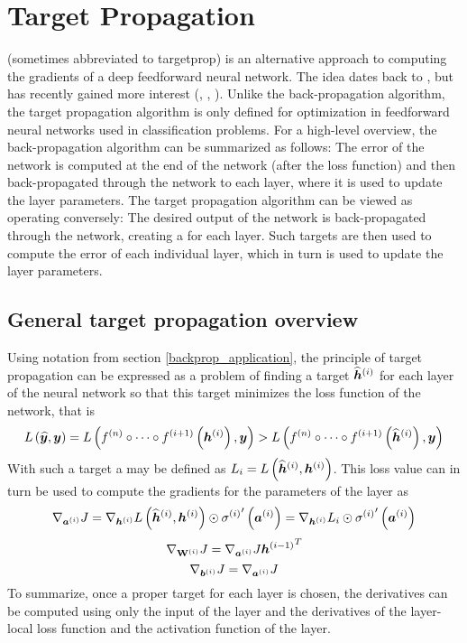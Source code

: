 \chapter{Target Propagation}\label{targetprop}

 (sometimes abbreviated to targetprop) is an alternative approach to computing the gradients of a deep feedforward neural network. The idea dates back to \cite{lecun_learning_1986}, but has recently gained more interest (\cite{bengio_how_2014}, \cite{bengio_towards_2015}, \cite{lee_difference_2015}). Unlike the back-propagation algorithm, the target propagation algorithm is only defined for optimization in feedforward neural networks used in classification problems. For a high-level overview, the back-propagation algorithm can be summarized as follows: The error of the network is computed at the end of the network (after the loss function) and then back-propagated through the network to each layer, where it is used to update the layer parameters. The target propagation algorithm can be viewed as operating conversely: The desired output of the network is back-propagated through the network, creating a  for each layer. Such targets are then used to compute the error of each individual layer, which in turn is used to update the layer parameters.


\section{General target propagation overview}

Using notation from section \ref{backprop_application}, the principle of target propagation can be expressed as a problem of finding a target \( \widehat{\bm{h}}^{(i)} \) for each layer of the neural network so that this target minimizes the loss function of the network, that is
\begin{equation}\label{targetprop_loss_bound}
	L \left( \widehat{\bm{y}}, \bm{y} \right) = L \left( f^{(n)} \circ \dots \circ f^{(i + 1)} \left( \bm{h}^{(i)} \right), \bm{y} \right) > L \left( f^{(n)} \circ \dots \circ f^{(i + 1)} \left( \widehat{\bm{h}}^{(i)} \right), \bm{y} \right)
\end{equation}
With such a target a  may be defined as \( L_i = L \left( \widehat{\bm{h}}^{(i)}, \bm{h}^{(i)} \right) \). This loss value can in turn be used to compute the gradients for the parameters of the layer as
\[ \nabla_{\bm{a}^{(i)}} J = \nabla_{\bm{h}^{(i)}} L \left( \widehat{\bm{h}}^{(i)}, \bm{h}^{(i)} \right) \odot {\sigma^{(i)}}' \left( \bm{a}^{(i)} \right)  = \nabla_{\bm{h}^{(i)}} L_i \odot {\sigma^{(i)}}' \left( \bm{a}^{(i)} \right) \]
\[ \nabla_{\mathbf{W}^{(i)}} J = \nabla_{\bm{a}^{(i)}} J {\bm{h}^{(i - 1)}}^T \]
\[ \nabla_{\bm{b}^{(i)}} J = \nabla_{\bm{a}^{(i)}} J \]
To summarize, once a proper target for each layer is chosen, the derivatives can be computed using only the input of the layer and the derivatives of the layer-local loss function and the activation function of the layer.

